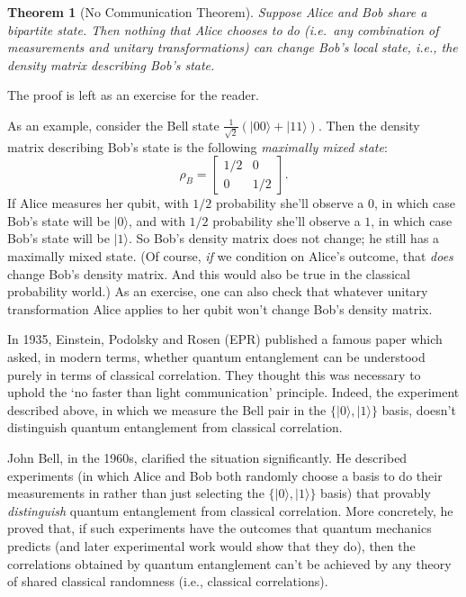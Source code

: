 \documentclass[11pt]{report}
\theoremstyle{plain}
\newtheorem{theorem}{Theorem}[section]
\theoremstyle{definition}
\renewcommand{\ket}[1]{|#1\rangle}
\begin{document}
\begin{theorem}[No Communication Theorem]
Suppose Alice and Bob share a bipartite state. Then nothing that Alice chooses to do (i.e.\ any combination of measurements and unitary transformations) can change Bob's local state, i.e., the density matrix describing Bob's state.
\end{theorem}

The proof is left as an exercise for the reader.

As an example, consider the Bell state $\frac{1}{\sqrt{2}} (\ket{00} + \ket{11})$. Then the density matrix describing Bob's state is the following \emph{maximally mixed state}:
\[
\rho_B = \begin{bmatrix}
1/2 & 0 \\
0 & 1/2
\end{bmatrix}.
\]
If Alice measures her qubit, with $1/2$ probability she'll observe a $0$, in which case Bob's state will be $\ket{0}$, and with $1/2$ probability she'll observe a $1$, in which case Bob's state will be $\ket{1}$. So Bob's density matrix does not change; he still has a maximally mixed state. (Of course, \emph{if} we condition on Alice's outcome, that \emph{does} change Bob's density matrix. And this would also be true in the classical probability world.) As an exercise, one can also check that whatever unitary transformation Alice applies to her qubit won't change Bob's density matrix.

In 1935, Einstein, Podolsky and Rosen (EPR) published a famous paper which asked, in modern terms, whether quantum entanglement can be understood purely in terms of classical correlation.  They thought this was necessary to uphold the `no faster than light communication' principle. Indeed, the experiment described above, in which we measure the Bell pair in the $\{\ket{0}, \ket{1}\}$ basis, doesn't distinguish quantum entanglement from classical correlation.

John Bell, in the 1960s, clarified the situation significantly. He described experiments (in which Alice and Bob both randomly choose a basis to do their measurements in rather than just selecting the $\{\ket{0}, \ket{1}\}$ basis) that provably {\em distinguish} quantum entanglement from classical correlation.  More concretely, he proved that, if such experiments have the outcomes that quantum mechanics predicts (and later experimental work would show that they do), then the correlations obtained by quantum entanglement can't be achieved by any theory of shared classical randomness (i.e., classical correlations).
\end{document}

